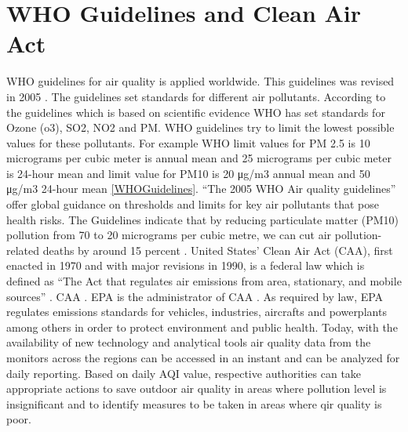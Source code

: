\documentclass[sigconf]{acmart}
\begin{document}
{  \section{WHO Guidelines and Clean Air Act} WHO guidelines for air quality is applied worldwide. This guidelines was revised in 2005 \cite{www-who}. The guidelines set standards for different air pollutants. According to the guidelines which is based on scientific evidence WHO has set standards for Ozone (o3), SO2, NO2 and PM. WHO guidelines try to limit the lowest possible values for these pollutants. For example WHO limit values for PM 2.5 is 10 micrograms per cubic meter is annual mean and 25 micrograms per cubic meter is 24-hour mean and limit value for PM10 is 20 μg/m3 annual mean and 50 μg/m3 24-hour mean \cite{www-who} \ref{WHOGuidelines}. ``The 2005 WHO Air quality guidelines'' offer global guidance on thresholds and limits for key air pollutants that pose health risks. The Guidelines indicate that by reducing particulate matter (PM10) pollution from 70 to 20 micrograms per cubic metre, we can cut air pollution-related deaths by around 15 percent \cite{www-who}.
  United States' Clean Air Act (CAA), first enacted in 1970 and with major revisions in 1990, is a federal law which is defined as ``The Act that regulates air emissions from area, stationary, and mobile sources'' \cite{epa-gov}. CAA  . EPA is the administrator of CAA \cite{wikipedia-org}. As required by law, EPA regulates emissions standards for vehicles, industries, aircrafts and powerplants among others in order to protect environment and public health. Today, with the availability of new technology and analytical tools air quality data from the monitors across the regions can be accessed in an instant and can be analyzed for daily reporting. Based on daily AQI value, respective authorities can take appropriate actions to save outdoor air quality in areas where pollution level is insignificant and to identify measures to be taken in areas where qir quality is poor.
}
\end{document}
